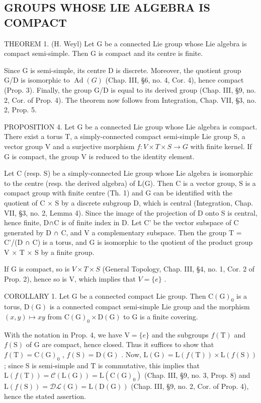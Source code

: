 \subsection{GROUPS WHOSE LIE ALGEBRA IS COMPACT}

THEOREM 1. (H. Weyl) Let G be a connected Lie group whose Lie algebra is compact semi-simple. Then G is compact and its centre is finite.

Since G is semi-simple, its centre D is discrete. Moreover, the quotient group G/D is isomorphic to \(\operatorname{Ad}(G)\) (Chap. III, §6, no. 4, Cor. 4), hence compact (Prop. 3). Finally, the group G/D is equal to its derived group (Chap. III, §9, no. 2, Cor. of Prop. 4). The theorem now follows from Integration, Chap. VII, §3, no. 2, Prop. 5.

PROPOSITION 4. Let G be a connected Lie group whose Lie algebra is compact. There exist a torus T, a simply-connected compact semi-simple Lie group S, a vector group V and a surjective morphism \(f: V \times T \times S \to G\) with finite kernel. If G is compact, the group V is reduced to the identity element.

Let C (resp. S) be a simply-connected Lie group whose Lie algebra is isomorphic to the centre (resp. the derived algebra) of L(G). Then C is a vector group, S is a compact group with finite centre (Th. 1) and G can be identified with the quotient of C × S by a discrete subgroup D, which is central (Integration, Chap. VII, §3, no. 2, Lemma 4). Since the image of the projection of D onto S is central, hence finite, D∩C is of finite index in D. Let C' be the vector subspace of C generated by D ∩ C, and V a complementary subspace. Then the group T = C'/(D ∩ C) is a torus, and G is isomorphic to the quotient of the product group V × T × S by a finite group.

If G is compact, so is \(V \times T \times S\) (General Topology, Chap. III, §4, no. 1, Cor. 2 of Prop. 2), hence so is V, which implies that \(V = \{e\}\) .

COROLLARY 1. Let G be a connected compact Lie group. Then \(\mathrm{C}(\mathrm{G})_{0}\) is a torus, \(\mathrm{D}(\mathrm{G})\) is a connected compact semi-simple Lie group and the morphism \((x,y)\mapsto xy\) from \(\mathrm{C}(\mathrm{G})_{0}\times\mathrm{D}(\mathrm{G})\) to G is a finite covering.

With the notation in Prop. 4, we have \(\mathrm{V} = \{e\}\) and the subgroups \(f(\mathrm{T})\) and \(f(\mathrm{S})\) of \(\mathrm{G}\) are compact, hence closed. Thus it suffices to show that \(f(\mathrm{T}) = \mathrm{C}(\mathrm{G})_0\) , \(f(\mathrm{S}) = \mathrm{D}(\mathrm{G})\) . Now, \(\mathrm{L}(\mathrm{G}) = \mathrm{L}(f(\mathrm{T})) \times \mathrm{L}(f(\mathrm{S}))\) ; since \(\mathrm{S}\) is semi-simple and \(\mathrm{T}\) is commutative, this implies that \(\mathrm{L}(f(\mathrm{T})) = \mathcal{C}(\mathrm{L}(\mathrm{G})) = \mathrm{L}(\mathrm{C}(\mathrm{G})_0)\) (Chap. III, §9, no. 3, Prop. 8) and \(\mathrm{L}(f(\mathrm{S})) = \mathcal{DL}(\mathrm{G}) = \mathrm{L}(\mathrm{D}(\mathrm{G}))\) (Chap. III, §9, no. 2, Cor. of Prop. 4), hence the stated assertion.

